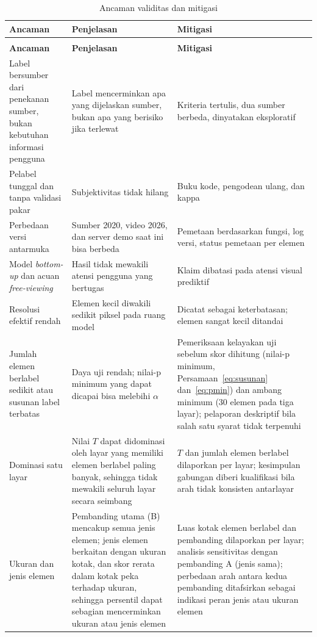 \begin{longtable}{>{\raggedright\arraybackslash}p{}>{\raggedright\arraybackslash}p{}>{\raggedright\arraybackslash}p{}}
\caption{Ancaman validitas dan mitigasi}
\label{tab:validitas}\\
\hline
\textbf{Ancaman} & \textbf{Penjelasan} & \textbf{Mitigasi} \\
\hline
\endfirsthead
\multicolumn{3}{l}{\emph{Tabel~\ref{tab:validitas} (lanjutan)}}\\
\hline
\textbf{Ancaman} & \textbf{Penjelasan} & \textbf{Mitigasi} \\
\hline
\endhead
\hline
\endfoot
Label bersumber dari penekanan sumber, bukan kebutuhan informasi pengguna & Label mencerminkan apa yang dijelaskan sumber, bukan apa yang berisiko jika terlewat & Kriteria tertulis, dua sumber berbeda, dinyatakan eksploratif \\
\hline
Pelabel tunggal dan tanpa validasi pakar & Subjektivitas tidak hilang & Buku kode, pengodean ulang, dan kappa \\
\hline
Perbedaan versi antarmuka & Sumber 2020, video 2026, dan server demo saat ini bisa berbeda & Pemetaan berdasarkan fungsi, log versi, status pemetaan per elemen \\
\hline
Model \emph{bottom-up} dan acuan \emph{free-viewing} & Hasil tidak mewakili atensi pengguna yang bertugas & Klaim dibatasi pada atensi visual prediktif \\
\hline
Resolusi efektif rendah & Elemen kecil diwakili sedikit piksel pada ruang model & Dicatat sebagai keterbatasan; elemen sangat kecil ditandai \\
\hline
Jumlah elemen berlabel sedikit atau susunan label terbatas & Daya uji rendah; nilai-p minimum yang dapat dicapai bisa melebihi $\alpha$ & Pemeriksaan kelayakan uji sebelum skor dihitung (nilai-p minimum, Persamaan~\eqref{eq:susunan} dan~\eqref{eq:pmin}) dan ambang minimum (30 elemen pada tiga layar); pelaporan deskriptif bila salah satu syarat tidak terpenuhi \\
\hline
Dominasi satu layar & Nilai $T$ dapat didominasi oleh layar yang memiliki elemen berlabel paling banyak, sehingga tidak mewakili seluruh layar secara seimbang & $T$ dan jumlah elemen berlabel dilaporkan per layar; kesimpulan gabungan diberi kualifikasi bila arah tidak konsisten antarlayar \\
\hline
Ukuran dan jenis elemen & Pembanding utama (B) mencakup semua jenis elemen; jenis elemen berkaitan dengan ukuran kotak, dan skor rerata dalam kotak peka terhadap ukuran, sehingga persentil dapat sebagian mencerminkan ukuran atau jenis elemen & Luas kotak elemen berlabel dan pembanding dilaporkan per layar; analisis sensitivitas dengan pembanding A (jenis sama); perbedaan arah antara kedua pembanding ditafsirkan sebagai indikasi peran jenis atau ukuran elemen \\

\end{longtable}
